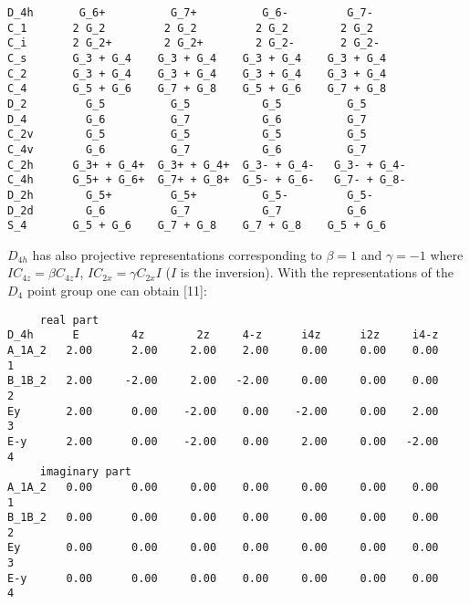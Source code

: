 \documentclass[12pt,a4paper,twoside]{report}
\begin{document}
\begin{tcolorbox}
\begin{footnotesize}
\begin{verbatim}
D_4h       G_6+          G_7+          G_6-         G_7-
C_1       2 G_2         2 G_2         2 G_2        2 G_2
C_i       2 G_2+        2 G_2+        2 G_2-       2 G_2-
C_s       G_3 + G_4    G_3 + G_4    G_3 + G_4    G_3 + G_4
C_2       G_3 + G_4    G_3 + G_4    G_3 + G_4    G_3 + G_4
C_4       G_5 + G_6    G_7 + G_8    G_5 + G_6    G_7 + G_8
D_2         G_5          G_5           G_5          G_5
D_4         G_6          G_7           G_6          G_7
C_2v        G_5          G_5           G_5          G_5
C_4v        G_6          G_7           G_6          G_7
C_2h      G_3+ + G_4+  G_3+ + G_4+  G_3- + G_4-   G_3- + G_4-
C_4h      G_5+ + G_6+  G_7+ + G_8+  G_5- + G_6-   G_7- + G_8-
D_2h        G_5+         G_5+          G_5-         G_5-
D_2d        G_6          G_7           G_7          G_6
S_4       G_5 + G_6    G_7 + G_8    G_7 + G_8    G_5 + G_6
\end{verbatim}
\end{footnotesize}
\end{tcolorbox}

$D_{4h}$ has also projective representations corresponding to
$\beta=1$ and $\gamma=-1$ where $IC_{4z} = \beta C_{4z} I$, 
$IC_{2x} = \gamma C_{2x} I$ ($I$ is the inversion).
With the representations of the $D_4$ point group one can obtain [11]:

\begin{tcolorbox}
\begin{footnotesize}
\begin{verbatim}
     real part
D_4h      E        4z        2z     4-z      i4z      i2z     i4-z
A_1A_2   2.00      2.00     2.00    2.00     0.00     0.00    0.00    1
B_1B_2   2.00     -2.00     2.00   -2.00     0.00     0.00    0.00    2
Ey       2.00      0.00    -2.00    0.00    -2.00     0.00    2.00    3
E-y      2.00      0.00    -2.00    0.00     2.00     0.00   -2.00    4
     imaginary part
A_1A_2   0.00      0.00     0.00    0.00     0.00     0.00    0.00    1
B_1B_2   0.00      0.00     0.00    0.00     0.00     0.00    0.00    2
Ey       0.00      0.00     0.00    0.00     0.00     0.00    0.00    3
E-y      0.00      0.00     0.00    0.00     0.00     0.00    0.00    4
\end{verbatim}
\end{footnotesize}
\end{tcolorbox}
\end{document}
